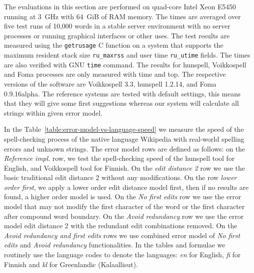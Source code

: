 \documentclass[free]{flammie}
\begin{document}
The evaluations in this section are performed on quad-core Intel Xeon E5450
running at 3~GHz with 64~GiB of RAM memory. The times are averaged over five
test runs of 10,000 words in a stable server environment with no server processes
or running graphical interfaces or other uses. The test results are measured using the
\texttt{getrusage} C function on a system that supports the maximum resident
stack size \texttt{ru\_maxrss} and user time \texttt{ru\_utime} fields. The
times are also verified with GNU \texttt{time} command. The results for
hunspell, Voikkospell and Foma processes are only measured with time and top.
The respective versions of the software are Voikkospell 3.3, hunspell
1.2.14, and Foma 0.9.16alpha. The reference systems are tested with default
settings, this means that they will give some first suggestions whereas
our system will calculate all strings within given error model.

In the Table~\ref{table:error-model-vs-language-speed} we measure the speed of
the spell-checking process of the native language Wikipedia with real-world
spelling errors and unknown strings. The error model rows are defined as
follows: on the \emph{Reference impl.} row, we test the spell-checking speed of
the hunspell tool for English, and Voikkospell tool for Finnish. On the
\emph{edit distance 2} row we use the basic traditional edit distance 2 without
any modifications. On the row \emph{lower order first}, we apply a
lower order edit distance model first, then if no results are found,
a higher order model is used. On the \emph{No first edits} row we
use the error model that may not modify the first character of the word or the
first character after compound word boundary. On the \emph{Avoid redundancy}
row we use the error model edit distance 2 with the redundant edit combinations
removed. On the \emph{Avoid redundancy and first edits} rows we use combined
error model of \emph{No first edits} and \emph{Avoid redundancy}
functionalities.  In the tables and formulae we routinely use the language
codes to denote the languages: \emph{en} for English, \emph{fi} for Finnish and
\emph{kl} for Greenlandic (Kalaallisut). 
\end{document}
